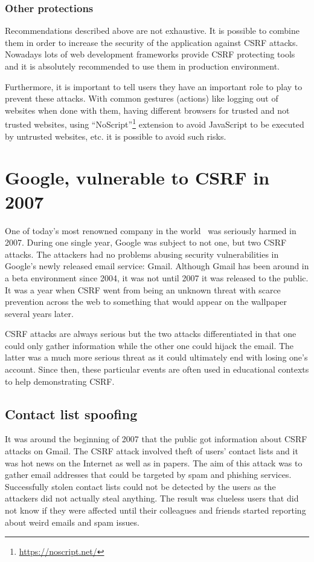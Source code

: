 \documentclass[a4paper,11pt,openany]{report}
\begin{document}
  \subsubsection{Other protections}  
  Recommendations described above are not exhaustive. It is possible to combine them in order to increase 
  the security of the application against CSRF attacks. Nowadays lots of web development frameworks provide 
  CSRF protecting tools and it is absolutely recommended to use them in production environment.
  
  Furthermore, it is important to tell users they have an important role to play to prevent these attacks. 
  With common gestures (actions) like logging out of websites when done with them, having different browsers 
  for trusted and not trusted websites, using ``NoScript''\footnote{\url{https://noscript.net/}} extension to 
  avoid JavaScript to be executed by untrusted websites, etc. it is possible to avoid such risks.
  
  \section{Google, vulnerable to CSRF in 2007}
  One of today's most renowned company in the world~\cite{forbes} was seriously harmed in 2007. During one single year, 
  Google was subject to not one, but two CSRF attacks. The attackers had no problems abusing security 
  vulnerabilities in Google's newly released email service: Gmail. Although Gmail has been around in a beta 
  environment since 2004, it was not until 2007 it was released to the public. It was a year when CSRF went from 
  being an unknown threat with scarce prevention across the web to something that would appear on the wallpaper 
  several years later.
  
  CSRF attacks are always serious but the two attacks differentiated in that one could only gather information 
  while the other one could hijack the email. The latter was a much more serious threat as it could ultimately end 
  with losing one's account. Since then, these particular events are often used in educational contexts to help 
  demonstrating CSRF. 

  
  \subsection{Contact list spoofing}
  It was around the beginning of 2007 that the public got information about CSRF attacks on Gmail. The CSRF 
  attack involved theft of users' contact lists and it was hot news on the Internet as well as in papers. The 
  aim of this attack was to gather email addresses that could be targeted by spam and phishing services.
  Successfully stolen contact lists could not be detected by the users as the attackers did not actually steal
  anything. The result was clueless users that did not know if they were affected until their colleagues and 
  friends started reporting about weird emails and spam issues.
  
\end{document}
